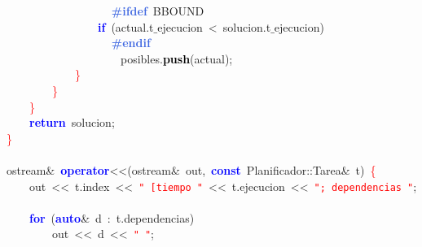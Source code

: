 \mbox{}\textbf{\textcolor{RoyalBlue}{\ \ \ \ \ \ \ \ \ \ \ \ \ \ \ \ \#ifdef}}\ BBOUND \\
\mbox{}\ \ \ \ \ \ \ \ \ \ \ \ \ \ \ \ \textbf{\textcolor{Blue}{if}}\ \textcolor{BrickRed}{(}actual\textcolor{BrickRed}{.}t$\_$ejecucion\ \textcolor{BrickRed}{\textless{}}\ solucion\textcolor{BrickRed}{.}t$\_$ejecucion\textcolor{BrickRed}{)} \\
\mbox{}\textbf{\textcolor{RoyalBlue}{\ \ \ \ \ \ \ \ \ \ \ \ \ \ \ \ \#endif}} \\
\mbox{}\ \ \ \ \ \ \ \ \ \ \ \ \ \ \ \ \ \ \ \ posibles\textcolor{BrickRed}{.}\textbf{\textcolor{Black}{push}}\textcolor{BrickRed}{(}actual\textcolor{BrickRed}{);} \\
\mbox{}\ \ \ \ \ \ \ \ \ \ \ \ \textcolor{Red}{\}} \\
\mbox{}\ \ \ \ \ \ \ \ \textcolor{Red}{\}} \\
\mbox{}\ \ \ \ \textcolor{Red}{\}} \\
\mbox{}\ \ \ \ \textbf{\textcolor{Blue}{return}}\ solucion\textcolor{BrickRed}{;} \\
\mbox{}\textcolor{Red}{\}} \\
\mbox{} \\
\mbox{}ostream\textcolor{BrickRed}{\&}\ \textbf{\textcolor{Blue}{operator}}\textcolor{BrickRed}{\textless{}\textless{}(}ostream\textcolor{BrickRed}{\&}\ out\textcolor{BrickRed}{,}\ \textbf{\textcolor{Blue}{const}}\ Planificador\textcolor{BrickRed}{::}Tarea\textcolor{BrickRed}{\&}\ t\textcolor{BrickRed}{)}\ \textcolor{Red}{\{} \\
\mbox{}\ \ \ \ out\ \textcolor{BrickRed}{\textless{}\textless{}}\ t\textcolor{BrickRed}{.}index\ \textcolor{BrickRed}{\textless{}\textless{}}\ \texttt{\textcolor{Red}{"{}\ [tiempo\ "{}}}\ \textcolor{BrickRed}{\textless{}\textless{}}\ t\textcolor{BrickRed}{.}ejecucion\ \textcolor{BrickRed}{\textless{}\textless{}}\ \texttt{\textcolor{Red}{"{};\ dependencias\ "{}}}\textcolor{BrickRed}{;} \\
\mbox{} \\
\mbox{}\ \ \ \ \textbf{\textcolor{Blue}{for}}\ \textcolor{BrickRed}{(}\textbf{\textcolor{Blue}{auto}}\textcolor{BrickRed}{\&}\ d\ \textcolor{BrickRed}{:}\ t\textcolor{BrickRed}{.}dependencias\textcolor{BrickRed}{)} \\
\mbox{}\ \ \ \ \ \ \ \ out\ \textcolor{BrickRed}{\textless{}\textless{}}\ d\ \textcolor{BrickRed}{\textless{}\textless{}}\ \texttt{\textcolor{Red}{"{}\ "{}}}\textcolor{BrickRed}{;} \\
\mbox{} \\
